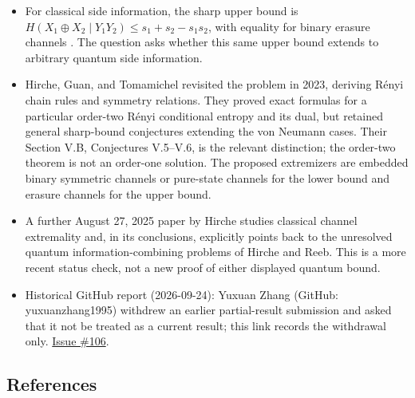 \begin{itemize}
  \item For classical side information, the sharp upper bound is $H(X_1\oplus X_2\mid Y_1Y_2)\leq s_1+s_2-s_1s_2$, with equality for binary erasure channels . The question asks whether this same upper bound extends to arbitrary quantum side information.

  \item Hirche, Guan, and Tomamichel revisited the problem in 2023, deriving Rényi chain rules and symmetry relations. They proved exact formulas for a particular order-two Rényi conditional entropy and its dual, but retained general sharp-bound conjectures extending the von Neumann cases. Their Section V.B, Conjectures V.5–V.6, is the relevant distinction; the order-two theorem is not an order-one solution. The proposed extremizers are embedded binary symmetric channels or pure-state channels for the lower bound and erasure channels for the upper bound. 

  \item A further August 27, 2025 paper by Hirche studies classical channel extremality and, in its conclusions, explicitly points back to the unresolved quantum information-combining problems of Hirche and Reeb. This is a more recent status check, not a new proof of either displayed quantum bound. 

  \item Historical GitHub report (2026-09-24): Yuxuan Zhang (GitHub: yuxuanzhang1995) withdrew an earlier partial-result submission and asked that it not be treated as a current result; this link records the withdrawal only. \href{https://github.com/Naixu-Guo/quantum-open-problems/issues/106}{Issue \#106}.
\end{itemize}

\subsection*{References}

